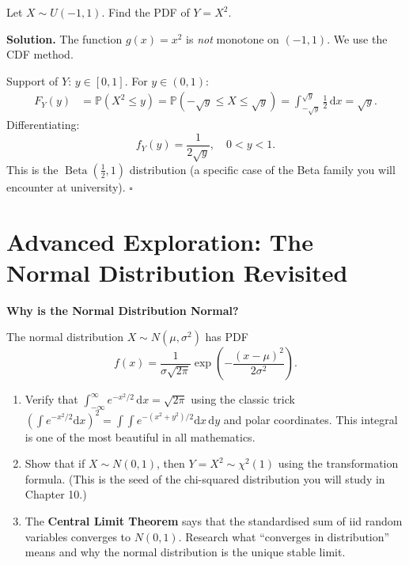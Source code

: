\documentclass[12pt, a4paper, oneside]{book}
\theoremstyle{definition}
\theoremstyle{plain}
\theoremstyle{remark}
\newcommand{\Prob}{\mathbb{P}}
\newenvironment{solution}
  {\par\medskip\noindent\textbf{Solution.}\quad}
  {\hfill$\square$\par\medskip}
\begin{document}
\begin{workedexample}
Let $X\sim U(-1,1)$.  Find the PDF of $Y = X^2$.

\begin{solution}
The function $g(x)=x^2$ is \emph{not} monotone on $(-1,1)$.  We use the CDF method.

Support of $Y$: $y\in[0,1]$.  For $y\in(0,1)$:
\begin{align*}
  F_Y(y) &= \Prob(X^2 \le y) = \Prob(-\sqrt{y}\le X\le\sqrt{y})
  = \int_{-\sqrt{y}}^{\sqrt{y}} \frac{1}{2}\,\mathrm{d}x = \sqrt{y}.
\end{align*}
Differentiating:
\[
  f_Y(y) = \frac{1}{2\sqrt{y}}, \quad 0 < y < 1.
\]
This is the $\operatorname{Beta}(\tfrac{1}{2},1)$ distribution (a specific case of the
Beta family you will encounter at university).
\end{solution}
\end{workedexample}

\section{Advanced Exploration: The Normal Distribution Revisited}

\begin{exploration}
\textbf{Why is the Normal Distribution Normal?}

The normal distribution $X\sim N(\mu,\sigma^2)$ has PDF
\[
  f(x) = \frac{1}{\sigma\sqrt{2\pi}}\exp\!\left(-\frac{(x-\mu)^2}{2\sigma^2}\right).
\]
\begin{enumerate}
  \item Verify that $\int_{-\infty}^{\infty} e^{-x^2/2}\,\mathrm{d}x = \sqrt{2\pi}$
        using the classic trick $\left(\int e^{-x^2/2}\mathrm{d}x\right)^2 = \int\!\int e^{-(x^2+y^2)/2}\mathrm{d}x\,\mathrm{d}y$
        and polar coordinates.  This integral is one of the most beautiful in all mathematics.
  \item Show that if $X\sim N(0,1)$, then $Y=X^2\sim\chi^2(1)$ using the transformation formula.
        (This is the seed of the chi-squared distribution you will study in Chapter 10.)
  \item The \textbf{Central Limit Theorem} says that the standardised sum of iid random
        variables converges to $N(0,1)$.  Research what ``converges in distribution'' means
        and why the normal distribution is the unique stable limit.
\end{enumerate}
\end{exploration}
\end{document}
